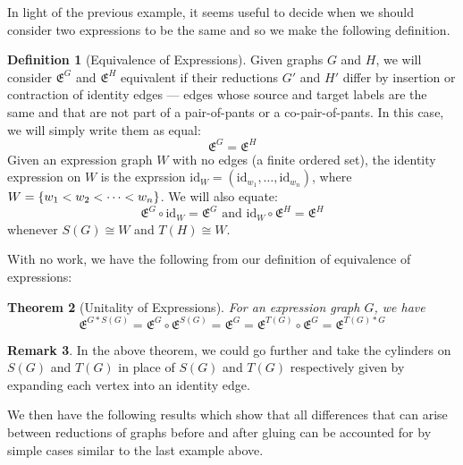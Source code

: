 \documentclass{amsart}
\newcommand{\id}{\text{id}}
\newcommand{\curly}[1]{\left\{ #1 \right\}}
\newcommand{\set}[2][]{\ifthenelse{\equal{#1}{}}
                                  {\curly{#2}}
                                  {\curly{#1\ \textbf{:}\ #2}}}
\newcommand{\Exp}[1]{\mathfrak{E}^{#1}}
\newtheorem{thm}{Theorem}
\numberwithin{thm}{section}
\theoremstyle{definition}
\newtheorem{defn}[thm]{Definition}
\newtheorem{rmk}[thm]{Remark}
\begin{document}
In light of the previous example, it seems useful to decide when we should
consider two expressions to be the same and so we make the following definition.

\begin{defn}[Equivalence of Expressions]
Given graphs $G$ and $H$, we will consider $\Exp{G}$ and $\Exp{H}$ equivalent
if their reductions $G'$ and $H'$ differ by insertion or contraction of identity
edges --- edges whose source and target labels are the same and that are not
part of a pair-of-pants or a co-pair-of-pants. In this case, we will simply
write them as equal:
\[
\Exp{G} = \Exp{H}
\]
Given an expression graph $W$ with no edges (a finite ordered set), the identity
expression on $W$ is the exprssion $\id_W = (\id_{w_1}, \dots, \id_{w_n})$,
where $W = \set{w_1 < w_2 < \dots < w_n}$. We will also equate:
\[
  \Exp{G} \circ \id_W = \Exp{G} \text{ and } \id_W \circ \Exp{H} = \Exp{H}
\]
whenever $S(G) \cong W$ and $T(H) \cong W$.
\end{defn}

With no work, we have the following from our definition of equivalence of
expressions:

\begin{thm}[Unitality of Expressions]
For an expression graph $G$, we have
\[
  \Exp{G * S(G)} = \Exp{G} \circ \Exp{S(G)} = \Exp{G}
  = \Exp{T(G)} \circ \Exp{G} = \Exp{T(G) * G}
\]
\end{thm}

\begin{rmk}
In the above theorem, we could go further and take the cylinders on $S(G)$ and
$T(G)$ in place of $S(G)$ and $T(G)$ respectively given by expanding each vertex
into an identity edge.
\end{rmk}

We then have the following results which show that all differences that can
arise between reductions of graphs before and after gluing can be accounted for
by simple cases similar to the last example above.
\end{document}
